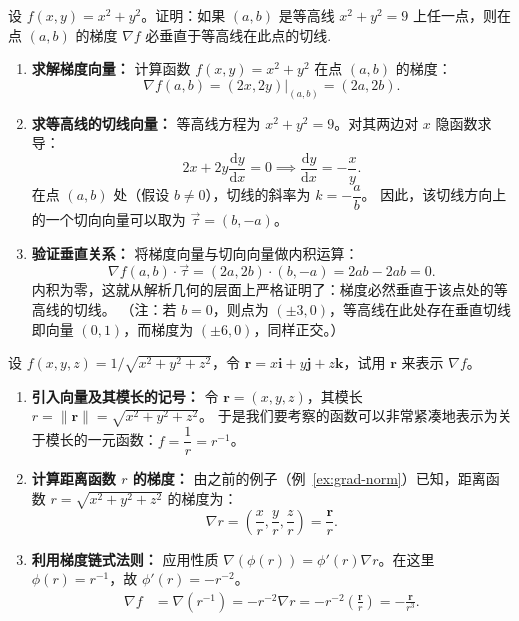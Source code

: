 \documentclass[lang=cn,11pt]{elegantbook}
\begin{document}
\begin{exercise}[梯度与等高线正交性]
设 $f(x,y)=x^2+y^2$。证明：如果 $(a,b)$ 是等高线 $x^2+y^2=9$ 上任一点，则在点 $(a,b)$ 的梯度 $\nabla f$ 必垂直于等高线在此点的切线.
\end{exercise}

\begin{solution}
\begin{enumerate}
  \item \textbf{求解梯度向量：}
  计算函数 $f(x,y) = x^2+y^2$ 在点 $(a,b)$ 的梯度：
  \[ \nabla f(a,b) = (2x, 2y)\big|_{(a,b)} = (2a, 2b). \]

  \item \textbf{求等高线的切线向量：}
  等高线方程为 $x^2+y^2=9$。对其两边对 $x$ 隐函数求导：
  \[ 2x + 2y \frac{\mathrm{d}y}{\mathrm{d}x} = 0 \implies \frac{\mathrm{d}y}{\mathrm{d}x} = -\frac{x}{y}. \]
  在点 $(a,b)$ 处（假设 $b \neq 0$），切线的斜率为 $k = -\dfrac{a}{b}$。
  因此，该切线方向上的一个切向向量可以取为 $\vec{\tau} = (b, -a)$。

  \item \textbf{验证垂直关系：}
  将梯度向量与切向向量做内积运算：
  \[ \nabla f(a,b) \cdot \vec{\tau} = (2a, 2b) \cdot (b, -a) = 2ab - 2ab = 0. \]
  内积为零，这就从解析几何的层面上严格证明了：梯度必然垂直于该点处的等高线的切线。
  （注：若 $b=0$，则点为 $(\pm3, 0)$，等高线在此处存在垂直切线即向量 $(0, 1)$，而梯度为 $(\pm6, 0)$，同样正交。）
\end{enumerate}
\end{solution}

\begin{exercise}[向径表示法计算梯度]
设 $f(x,y,z)=1/\sqrt{x^2+y^2+z^2}$，令 $\boldsymbol{r}=x\boldsymbol{i}+y\boldsymbol{j}+z\boldsymbol{k}$，试用 $\boldsymbol{r}$ 来表示 $\nabla f$。
\end{exercise}

\begin{solution}
\begin{enumerate}
  \item \textbf{引入向量及其模长的记号：}
  令 $\boldsymbol{r} = (x,y,z)$，其模长 $r = \|\boldsymbol{r}\| = \sqrt{x^2+y^2+z^2}$。
  于是我们要考察的函数可以非常紧凑地表示为关于模长的一元函数：$f = \dfrac{1}{r} = r^{-1}$。

  \item \textbf{计算距离函数 $r$ 的梯度：}
  由之前的例子（例~\ref{ex:grad-norm}）已知，距离函数 $r = \sqrt{x^2+y^2+z^2}$ 的梯度为：
  \[ \nabla r = \left( \frac{x}{r}, \frac{y}{r}, \frac{z}{r} \right) = \frac{\boldsymbol{r}}{r}. \]

  \item \textbf{利用梯度链式法则：}
  应用性质 $\nabla(\phi(r)) = \phi'(r)\nabla r$。在这里 $\phi(r) = r^{-1}$，故 $\phi'(r) = -r^{-2}$。
  \begin{align*}
  \nabla f &= \nabla (r^{-1}) = -r^{-2} \nabla r = -r^{-2} \left(\frac{\boldsymbol{r}}{r}\right) = -\frac{\boldsymbol{r}}{r^3}.
  \end{align*}
\end{enumerate}
\end{solution}
\end{document}

